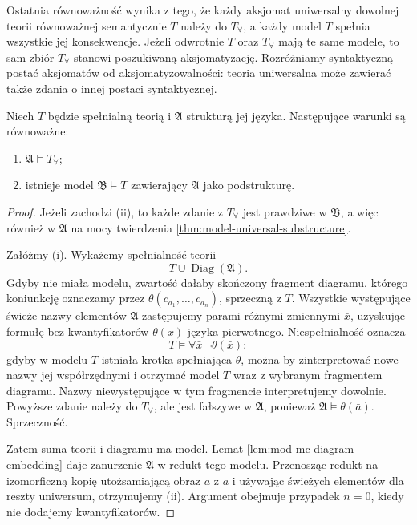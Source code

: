 Ostatnia równoważność wynika z tego, że każdy
aksjomat uniwersalny dowolnej teorii równoważnej
semantycznie $T$ należy do $T_{\forall}$,
a każdy model $T$ spełnia wszystkie jej konsekwencje.
Jeżeli odwrotnie $T$ oraz $T_{\forall}$ mają te same
modele, to sam zbiór $T_{\forall}$ stanowi poszukiwaną
aksjomatyzację.
Rozróżniamy syntaktyczną postać aksjomatów od
aksjomatyzowalności: teoria uniwersalna może zawierać
także zdania o innej postaci syntaktycznej.

\begin{twierdzenie}
\label{thm:mod-mc-universal-embedding}
Niech $T$ będzie spełnialną teorią i $\mathfrak A$
strukturą jej języka. Następujące warunki są równoważne:
\begin{enumerate}[label=(\roman*)]
\item $\mathfrak A\models T_{\forall}$;
\item istnieje model $\mathfrak B\models T$ zawierający
$\mathfrak A$ jako podstrukturę.
\end{enumerate}
\end{twierdzenie}
\begin{proof}
Jeżeli zachodzi (ii), to każde zdanie z $T_{\forall}$
jest prawdziwe w $\mathfrak B$, a więc również
w $\mathfrak A$ na mocy twierdzenia
\ref{thm:model-universal-substructure}.

Załóżmy (i). Wykażemy spełnialność teorii
\[
T\cup\operatorname{Diag}(\mathfrak A).
\]
Gdyby nie miała modelu, zwartość dałaby skończony
fragment diagramu, którego koniunkcję oznaczamy
przez $\theta(c_{a_1},\ldots,c_{a_n})$, sprzeczną z $T$.
Wszystkie występujące świeże nazwy elementów
$\mathfrak A$ zastępujemy parami różnymi zmiennymi
$\bar x$, uzyskując formułę bez kwantyfikatorów
$\theta(\bar x)$ języka pierwotnego.
Niespełnialność oznacza
\[
T\models\forall\bar x\,\neg\theta(\bar x):
\]
gdyby w modelu $T$ istniała krotka spełniająca
$\theta$, można by zinterpretować nowe nazwy
jej współrzędnymi i otrzymać model $T$ wraz
z wybranym fragmentem diagramu. Nazwy niewystępujące
w tym fragmencie interpretujemy dowolnie.
Powyższe zdanie należy do $T_{\forall}$, ale jest
fałszywe w $\mathfrak A$, ponieważ
$\mathfrak A\models\theta(\bar a)$. Sprzeczność.

Zatem suma teorii i diagramu ma model. Lemat
\ref{lem:mod-mc-diagram-embedding} daje zanurzenie
$\mathfrak A$ w redukt tego modelu. Przenosząc
redukt na izomorficzną kopię utożsamiającą
obraz $a$ z $a$ i używając świeżych elementów
dla reszty uniwersum, otrzymujemy (ii).
Argument obejmuje przypadek $n=0$, kiedy
nie dodajemy kwantyfikatorów.
\end{proof}


